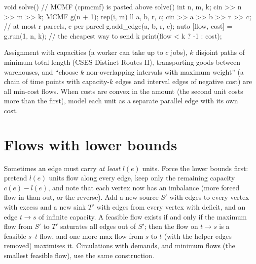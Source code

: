 \begin{code}
void solve() {  // MCMF (cpmcmf) is pasted above solve()
    int n, m, k;
    cin >> n >> m >> k;
    MCMF g(n + 1);
    rep(i, m) {
        ll a, b, r, c;
        cin >> a >> b >> r >> c;  // at most r parcels, c per parcel
        g.add_edge(a, b, r, c);
    }
    auto [flow, cost] = g.run(1, n, k);  // the cheapest way to send k
    print(flow < k ? -1 : cost);
}
\end{code}


\begin{trick}
Assignment with capacities (a worker can take up to $c$ jobs), $k$ disjoint paths of minimum total length (CSES Distinct Routes
II), transporting goods between warehouses, and ``choose $k$ non-overlapping intervals with maximum weight'' (a chain of time
points with capacity-$k$ edges and interval edges of negative cost) are all min-cost flows. When costs are convex in the amount
(the second unit costs more than the first), model each unit as a separate parallel edge with its own cost.
\end{trick}

\section[Flows with lower bounds]{Flows with lower bounds \hfill \ioi}\label{sec:lowerbounds}

Sometimes an edge must carry \emph{at least} $l(e)$ units. Force the lower bounds first: pretend $l(e)$ units flow along every edge,
keep only the remaining capacity $c(e) - l(e)$, and note that each vertex now has an imbalance (more forced flow in than out, or the
reverse). Add a new source $S'$ with edges to every vertex with excess and a new sink $T'$ with edges from every vertex with deficit,
and an edge $t \to s$ of infinite capacity. A feasible flow exists if and only if the maximum flow from $S'$ to $T'$ saturates all
edges out of $S'$; then the flow on $t \to s$ is a feasible $s$--$t$ flow, and one more max flow from $s$ to $t$ (with the helper
edges removed) maximises it. Circulations with demands, and minimum flows (the smallest feasible flow), use the same construction.


